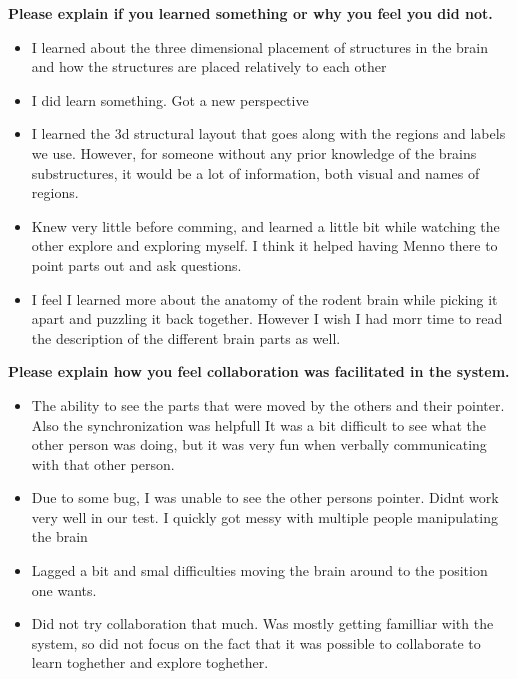 {\small
\noindent
\textbf{Please explain if you learned something or why you feel you did not.}
\begin{itemize}[]
    \itshape\footnotesize
    \item I learned about the three dimensional placement of structures in the brain and how the structures are placed relatively to each other
    \item I did learn something. Got a new perspective
    \item I learned the 3d structural layout that goes along with the regions and labels we use. However, for someone without any prior knowledge of the brains substructures, it would be a lot of information, both visual and names of regions.
    \item Knew very little before comming, and learned a little bit while watching the other explore and exploring myself. I think it helped having Menno there to point parts out and ask questions.
    \item I feel I learned more about the anatomy of the rodent brain while picking it apart and puzzling it back together. However I wish I had morr time to read the description of the different brain parts as well.
\end{itemize}
}

{\small
\noindent
\textbf{Please explain how you feel collaboration was facilitated in the system.}
\begin{itemize}[]
    \itshape\footnotesize

\item The ability to see the parts that were moved by the others and their pointer. Also the synchronization was helpfull
    It was a bit difficult to see what the other person was doing, but it was very fun when verbally communicating with that other person.
   \item Due to some bug, I was unable to see the other persons pointer.
    Didnt work very well in our test. I quickly got messy with multiple people manipulating the brain
    \item Lagged a bit and smal difficulties moving the brain around to the position one wants.
   \item Did not try collaboration that much. Was mostly getting familliar with the system, so did not focus on the fact that it was possible to collaborate to learn toghether and explore toghether.


\end{itemize}
}

